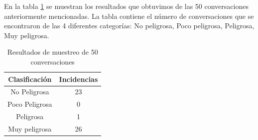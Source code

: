 %

%


En la tabla \ref{tab:resultadosM} se muestran los resultados que obtuvimos de las 50 conversaciones anteriormente mencionadas. La tabla contiene el n\'umero de conversaciones que se encontraron de las 4 diferentes categor\'ias: No peligrosa, Poco peligrosa, Peligrosa, Muy peligrosa.

\begin{table}[h]
\begin{center}


\begin{tabular}{|c|c|}
\hline
Clasificaci\'on & Incidencias \\
\hline

No Peligrosa & 23\\
Poco Peligrosa & 0\\
Peligrosa & 1\\
Muy peligrosa & 26\\
\hline
\end{tabular}

\caption{Resultados de muestreo de 50 conversaciones}
\label{tab:resultadosM}
\end{center}
\end{table}

